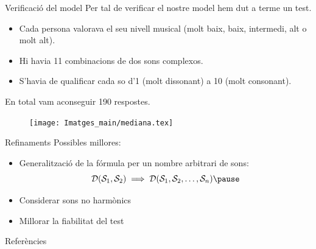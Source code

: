 \documentclass[10pt,hyperref={colorlinks,linkcolor=black,citecolor=blue!80,urlcolor=blue!60},handout]{beamer} %
\theoremstyle{definition}
\begin{document}
\begin{frame}{Verificació del model}
    Per tal de verificar el nostre model hem dut a terme un test. \pause
    \begin{itemize}
        \item Cada persona valorava el seu nivell musical (molt baix, baix, intermedi, alt o molt alt).\pause
        \item Hi havia 11 combinacions de dos sons complexos.\pause
        \item S'havia de qualificar cada so d'1 (molt dissonant) a 10 (molt consonant).
    \end{itemize}\pause
    En total vam aconseguir 190 respostes.
    \begin{figure}
        \centering
        \texttt{[image: Imatges\_main/mediana.tex]}
    \end{figure}
\end{frame}
\begin{frame}{Refinaments}
    Possibles millores:\pause
    \begin{itemize}
        \item Generalització de la fórmula per un nombre arbitrari de sons: $$\mathcal{D}(\mathcal{S}_1,\mathcal{S}_2)\implies\mathcal{D}(\mathcal{S}_1,\mathcal{S}_2,\ldots,\mathcal{S}_n)\text{\pause}$$
        \item Considerar sons no harmònics\pause
        \item Millorar la fiabilitat del test
    \end{itemize}
\end{frame}
\begin{frame}[noframenumbering]{Referències}
    \printbibliography[heading=none]
\end{frame}
\end{document}
